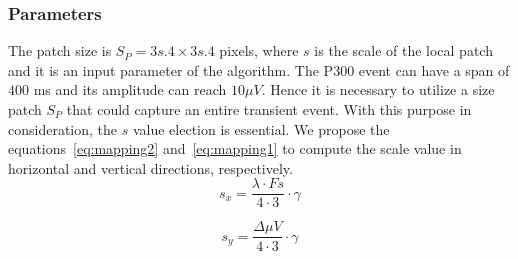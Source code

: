 \documentclass[entropy,article,submit,moreauthors,pdftex,10pt,a4paper]{mdpi}
\begin{document}

\subsubsection{Parameters}




The patch size is $S_P = 3s.4 \times 3s.4$ pixels, where $s$ is the scale of the local patch and it is an input parameter of the algorithm. The P300 event can have a span of $400$ ms and its amplitude can reach $ 10 \mu V $.  Hence it is necessary to utilize a size patch $S_P$ that could capture an entire transient event. With this purpose in consideration, the $s$ value election is essential.
We propose the equations~\ref{eq:mapping2} and~\ref{eq:mapping1} to compute the scale value in horizontal and vertical directions, respectively. 
\begin{equation}
s_x = \frac{\lambda \cdot Fs}{4 \cdot 3} \cdot \gamma
\label{eq:mapping2}
\end{equation}

\begin{equation}
s_y= \frac{\Delta \mu V}{4 \cdot 3} \cdot \gamma 
\label{eq:mapping1}
\end{equation}
\end{document}
